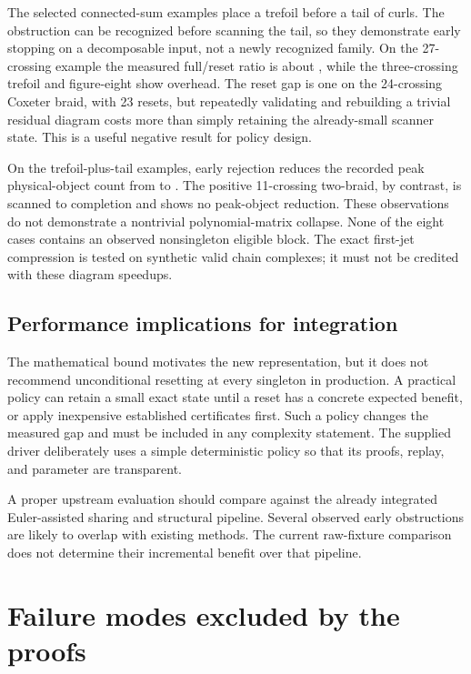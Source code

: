 \documentclass[11pt]{article}
\theoremstyle{definition}\newtheorem{definition}[theorem]{Definition}\newtheorem{example}[theorem]{Example}
\theoremstyle{remark}\newtheorem{remark}[theorem]{Remark}
\begin{document}


The selected connected-sum examples place a trefoil before a tail of curls. The obstruction can be recognized before scanning the tail, so they demonstrate early stopping on a decomposable input, not a newly recognized family. On the 27-crossing example the measured full/reset ratio is about \TailRatio{}, while the three-crossing trefoil and figure-eight show overhead. The reset gap is one on the 24-crossing Coxeter braid, with 23 resets, but repeatedly validating and rebuilding a trivial residual diagram costs more than simply retaining the already-small scanner state. This is a useful negative result for policy design.

On the trefoil-plus-tail examples, early rejection reduces the recorded peak physical-object count from \TailPeakFull{} to \TailPeakReset{}. The positive 11-crossing two-braid, by contrast, is scanned to completion and shows no peak-object reduction. These observations do not demonstrate a nontrivial polynomial-matrix collapse. None of the eight cases contains an observed nonsingleton eligible block. The exact first-jet compression is tested on synthetic valid chain complexes; it must not be credited with these diagram speedups.

\subsection{Performance implications for integration}
The mathematical bound motivates the new representation, but it does not recommend unconditional resetting at every singleton in production. A practical policy can retain a small exact state until a reset has a concrete expected benefit, or apply inexpensive established certificates first. Such a policy changes the measured gap and must be included in any complexity statement. The supplied driver deliberately uses a simple deterministic policy so that its proofs, replay, and parameter are transparent.

A proper upstream evaluation should compare against the already integrated Euler-assisted sharing and structural pipeline. Several observed early obstructions are likely to overlap with existing methods. The current raw-fixture comparison does not determine their incremental benefit over that pipeline.

\section{Failure modes excluded by the proofs}
\end{document}
